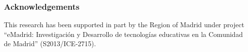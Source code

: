 \documentclass[a4paper]{article}
\begin{document}

\subsubsection{Acknowledgements}

This research has been supported in part 
by the Region of Madrid under project ``eMadrid:
Investigación y Desarrollo de tecnologías educativas en la
Comunidad de Madrid'' (S2013/ICE-2715).


 

\end{document}
